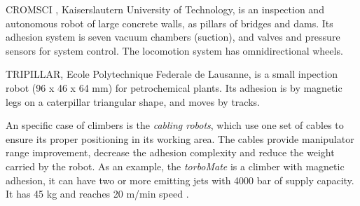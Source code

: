 
CROMSCI%
, Kaiserslautern University of Technology, is an
inspection and autonomous robot of large concrete walls, as
pillars of bridges and dams. Its adhesion system is seven vacuum
chambers (suction), and valves and pressure sensors for system control. The
locomotion system has omnidirectional wheels.



TRIPILLAR, Ecole Polytechnique Federale de Lausanne, is a small inpection robot
(96 x 46 x 64 mm) for petrochemical plants. Its adhesion is by magnetic legs on
a caterpillar triangular shape, and moves by tracks.

An specific case of climbers is the \textit{cabling robots}, which use one set
of cables to ensure its proper positioning in its working area. The cables provide
manipulator range improvement, decrease the adhesion complexity and reduce the
weight carried by the robot. As an example, the \textit{torboMate} is a climber
with magnetic adhesion, it can have two or more emitting jets with 4000 bar of
supply capacity. It has 45 kg and reaches 20 m/min speed \citep{torbo}.

